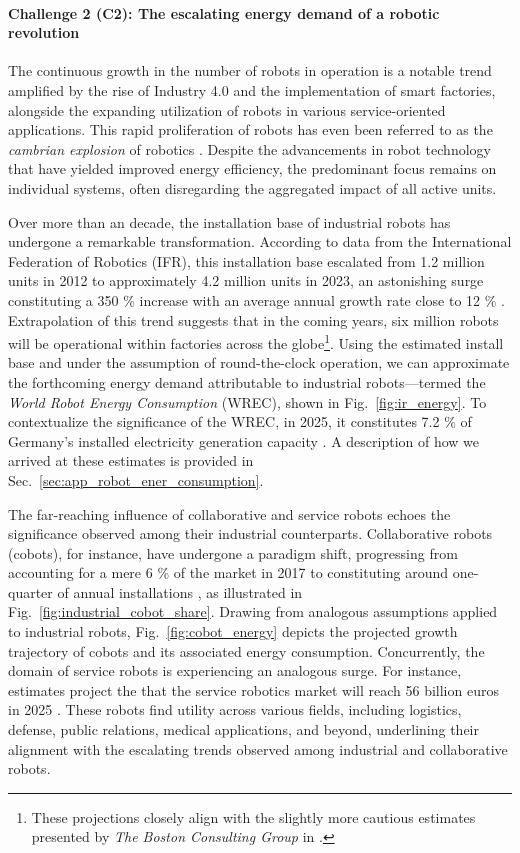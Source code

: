 \documentclass[12pt]{article}
\begin{document}
\paragraph*{\textbf{Challenge 2} (C2): The escalating energy demand of a robotic revolution}\label{sec:robots_challenge}
The continuous growth in the number of robots in operation is a notable trend amplified by the rise of Industry 4.0 and the implementation of smart factories, alongside the expanding utilization of robots in various service-oriented applications. This rapid proliferation of robots has even been referred to as the \textit{cambrian explosion} of robotics \cite{Pratt2015Iscambrianexplosion}. Despite the advancements in robot technology that have yielded improved energy efficiency, the predominant focus remains on individual systems, often disregarding the aggregated impact of all active units.

Over more than an decade, the installation base of industrial robots has undergone a remarkable transformation. According to data from the International Federation of Robotics (IFR), this installation base escalated from 1.2 million units in 2012 to approximately 4.2 million units in 2023, an astonishing surge constituting a 350 \% increase with an average annual growth rate close to 12 \% \cite{IFR2024WorldRobotics2024}. Extrapolation of this trend suggests that in the coming years, six million robots will be operational within factories across the globe\footnote{These projections closely align with the slightly more cautious estimates presented by \textit{The Boston Consulting Group} in \cite{Sirkin2015HowRobotsWill}.}. Using the estimated install base and under the assumption of round-the-clock operation, we can approximate the forthcoming energy demand attributable to industrial robots---termed the \textit{World Robot Energy Consumption} (WREC), shown in Fig.~\ref{fig:ir_energy}. To contextualize the significance of the WREC, in 2025, it constitutes 7.2 \% of Germany's installed electricity generation capacity \cite{FraunhoferISENetinstalledelectricity}. A description of how we arrived at these estimates is provided in Sec.~\ref{sec:app_robot_ener_consumption}.

The far-reaching influence of collaborative and service robots echoes the significance observed among their industrial counterparts. Collaborative robots (cobots), for instance, have undergone a paradigm shift, progressing from accounting for a mere 6 \% of the market in 2017 to constituting around one-quarter of annual installations \cite{tobe2015}, as illustrated in Fig.~\ref{fig:industrial_cobot_share}. Drawing from analogous assumptions applied to industrial robots, Fig.~\ref{fig:cobot_energy} depicts the projected growth trajectory of cobots and its associated energy consumption. Concurrently, the domain of service robots is experiencing an analogous surge. For instance, estimates project the that the service robotics market will reach 56 billion euros in 2025 \cite{statista_service_robots}. These robots find utility across various fields, including logistics, defense, public relations, medical applications, and beyond, underlining their alignment with the escalating trends observed among industrial and collaborative robots.
\end{document}
